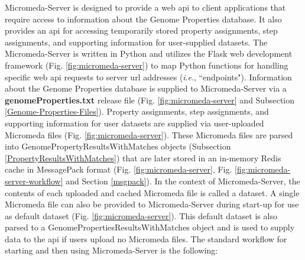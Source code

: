 Micromeda-Server is designed to provide a web \gls{api} to client applications 
that require access to information about the Genome Properties database. It also 
provides an \gls{api} for accessing temporarily stored property assignments, 
step assignments, and supporting information for user-supplied datasets. The 
Micromeda-Server is written in Python and utilizes the Flask web development 
framework \cite{grinberg2018flask} (Fig. \ref{fig:micromeda-server}) to map 
Python functions for handling specific web \gls{api} requests to server 
\gls{url} addresses (\textit{i}.\textit{e}., ``endpoints"). Information about the Genome 
Properties database is supplied to Micromeda-Server via a 
\textbf{genomeProperties.txt} release file (Fig. \ref{fig:micromeda-server} and 
Subsection \ref{Genome-Properties-Files}). Property assignments, step 
assignments, and supporting information for user datasets are supplied via 
user-uploaded Micromeda files (Fig. \ref{fig:micromeda-server}). These Micromeda 
files are parsed into GenomePropertyResultsWithMatches objects (Subsection 
\ref{PropertyResultsWithMatches}) that are later stored in an in-memory Redis 
cache \cite{han2011survey} in MessagePack format \cite{furuhashi2013messagepack} 
(Fig. \ref{fig:micromeda-server}, Fig. \ref{fig:micromeda-server-workflow} and 
Section \ref{msgpack}). In the context of Micromeda-Server, the contents of each 
uploaded and cached Micromeda file is called a dataset. A single Micromeda file 
can also be provided to Micromeda-Server during start-up for use as default 
dataset (Fig. \ref{fig:micromeda-server}). This default dataset is also parsed 
to a GenomePropertiesResultsWithMatches object and is used to supply data to the 
\gls{api} if users upload no Micromeda files. The standard workflow for starting 
and then using Micromeda-Server is the following:

